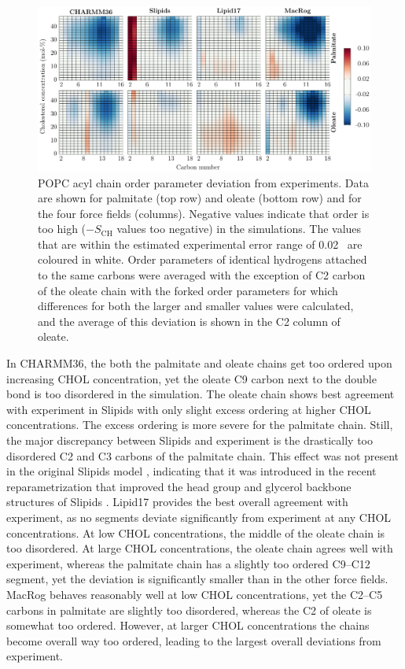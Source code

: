 \documentclass[journal=jctcce]{achemso}
\begin{document}
\begin{figure}[htb!]
  \centering
  \includegraphics[width=\linewidth]{../FIGS/OP_chains.pdf}
  \caption{\label{fig:OPmaps}%
  POPC acyl chain order parameter deviation from experiments. Data are shown for palmitate (top row) and oleate (bottom row) and for the four force fields (columns). Negative values indicate that order is too high ($-S_\mathrm{CH}$ values too negative) in the simulations. The values that are within the estimated experimental error range of 0.02~\cite{ollila16} are 
  coloured in white. Order parameters of identical hydrogens attached to the same carbons were averaged with the exception of C2 carbon of the oleate chain with the forked order parameters for which differences for both the larger and smaller values were calculated, and the average of this deviation is shown in the C2 column of oleate.
  }
\end{figure}



In CHARMM36, the both the palmitate and oleate chains get too ordered upon increasing CHOL concentration, yet the oleate C9 carbon next to the double bond is too disordered in the simulation. The oleate chain shows best agreement with experiment in Slipids with only slight excess ordering at higher CHOL concentrations. The excess ordering is more severe for the palmitate chain. Still, the major discrepancy between Slipids and experiment is the drastically too disordered C2 and C3 carbons of the palmitate chain. This effect was not present in the original Slipids model \cite{NMRlipidsDatabank}, indicating that it was introduced in the recent reparametrization that improved the head group and glycerol backbone structures of Slipids \cite{grote2020optimization}. Lipid17 provides the best overall agreement with experiment, as no segments deviate significantly from experiment at any CHOL concentrations. At low CHOL concentrations, the middle of the oleate chain is too disordered.
At large CHOL concentrations, the oleate chain agrees well with experiment, whereas the palmitate chain has a slightly too ordered C9--C12 segment, yet the deviation is significantly smaller than in the other force fields. MacRog behaves reasonably well at low CHOL concentrations, yet the C2--C5 carbons in palmitate are slightly too disordered, whereas the C2 of oleate is somewhat too ordered. However, at larger CHOL concentrations the chains become overall way too ordered, leading to the largest overall deviations from experiment.
\end{document}
